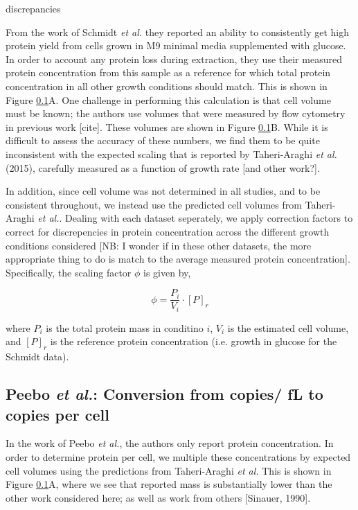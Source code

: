 discrepancies \documentclass[11pt, letterpaper]{article}
\begin{document}
From the work of Schmidt {\it et al.} they reported an ability to consistently get high
protein yield from cells grown in M9 minimal media supplemented with glucose. In order
to account any protein loss during extraction, they use their measured protein concentration
from this sample as a reference for which total protein concentration in all other growth
conditions should match. This is shown in Figure \ref{}A. One challenge in
performing this calculation is that cell volume must be known; the authors use
volumes that were  measured by flow cytometry in previous work [cite]. These
volumes are shown in Figure \ref{}B. While it is difficult to assess the
accuracy of these numbers, we find them to be quite inconsistent with the
expected scaling that is reported by Taheri-Araghi {\it et al.} (2015),
carefully
measured as a function of growth rate [and other work?].

In addition, since cell volume was not determined in all studies, and to be
consistent throughout, we instead use the predicted cell volumes from
Taheri-Araghi {\it et al.}. Dealing with each dataset seperately, we apply
correction  factors to correct for discrepencies in protein concentration across
the different growth conditions considered [NB: I wonder if in these other
datasets, the more appropriate thing to do is match to the average measured
protein concentration]. Specifically, the scaling factor $\phi$ is given by,

\begin{equation}
\phi  =  \frac{P_i}{V_i} \cdot [P]_r
\end{equation}

where $P_i$ is the total protein mass in conditino $i$, $V_i$ is the estimated cell volume, and $[P]_r$ is
the reference protein concentration (i.e. growth in  glucose for the Schmidt data).


\subsection{Peebo {\it et al.}: Conversion from copies/ fL to copies per cell}

In the work of Peebo {\it et al.}, the authors only report protein concentration.
In  order to determine protein per cell, we multiple these concentrations by
expected cell volumes  using the predictions from  Taheri-Araghi {\it et al.} This is
shown in Figure \ref{}A, where we see that reported mass is substantially lower than
the other work considered here; as well as work from others [Sinauer, 1990].
\end{document}
